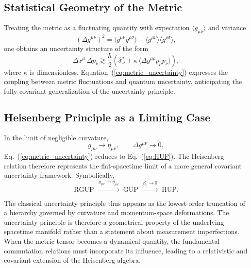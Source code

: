 \documentclass[11pt,oneside]{book}
\numberwithin{equation}{chapter}
\begin{document}
\subsection*{Statistical Geometry of the Metric}

Treating the metric as a fluctuating quantity with expectation $\langle g_{\mu\nu}\rangle$ and variance
\begin{equation}
(\Delta g^{\mu\nu})^2=\langle g^{\mu\nu}g^{\rho\sigma}\rangle
-\langle g^{\mu\nu}\rangle\langle g^{\rho\sigma}\rangle,
\end{equation}
one obtains an uncertainty structure of the form
\begin{equation}
\Delta x^\mu\,\Delta p_\nu
\gtrsim
\frac{\hbar}{2}\!\left(
\delta^\mu_{\ \nu}
+\kappa\,
\langle \Delta g^{\mu\rho}p_\rho p_\nu\rangle
\right),
\label{eq:metric_uncertainty}
\end{equation}
where $\kappa$ is dimensionless.  
Equation~(\ref{eq:metric_uncertainty}) expresses the coupling between metric fluctuations and quantum uncertainty, anticipating the fully covariant generalization of the uncertainty principle.

\subsection*{Heisenberg Principle as a Limiting Case}

In the limit of negligible curvature,
\begin{equation}
g_{\mu\nu}\rightarrow\eta_{\mu\nu}, \qquad
\Delta g^{\mu\nu}\rightarrow 0,
\end{equation}
Eq.~(\ref{eq:metric_uncertainty}) reduces to Eq.~(\ref{eq:HUP}).  
The Heisenberg relation therefore represents the flat-spacetime limit of a more general covariant uncertainty framework.  
Symbolically,
\begin{equation}
\text{RGUP} \;\xrightarrow{\,g_{\mu\nu}\to\eta_{\mu\nu}\,}\;
\text{GUP}
\;\xrightarrow{\,\beta_0\to0\,}\;
\text{HUP}.
\end{equation}

The classical uncertainty principle thus appears as the lowest-order truncation of a hierarchy governed by curvature and momentum-space deformations.
\clearpage
The uncertainty principle is therefore a geometrical property of the underlying spacetime manifold rather than a statement about measurement imperfections.  
When the metric tensor becomes a dynamical quantity, the fundamental commutation relations must incorporate its influence, leading to a relativistic and covariant extension of the Heisenberg algebra. \vspace{0.8em}
\end{document}
